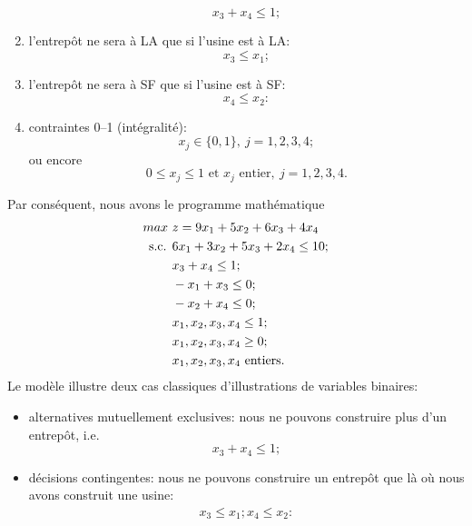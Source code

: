 \begin{example}
\begin{enumerate}
\[
x_3 + x_4 \leq 1;
\]
\item
l'entrepôt ne sera à LA que si l'usine est à LA:
\[
x_3 \leq x_1;
\]
\item
l'entrepôt ne sera à SF que si l'usine est à SF:
\[
x_4 \leq x_2:
\]
\item
contraintes 0--1 (intégralité):
\[
x_j \in \lbrace 0, 1 \rbrace,\ j = 1, 2, 3, 4;
\]
ou encore
\[
0 \leq x_j \leq 1 \mbox{ et } x_j \mbox{ entier},\ j = 1, 2, 3, 4.
\]
\end{enumerate}
Par conséquent, nous avons le programme mathématique
\begin{align*}
max\ & z = 9x_1 + 5x_2 + 6x_3 + 4x_4 \\
\mbox{s.c. } & 6x_1 + 3x_2 + 5x_3 + 2x_4 \leq 10; \\
& x_3 + x_4 \leq 1; \\
& -x_1 + x_3 \leq 0; \\
& -x_2 + x_4 \leq 0; \\
& x_1, x_2, x_3, x_4 \leq 1; \\
& x_1, x_2, x_3, x_4 \geq 0; \\
& x_1, x_2, x_3, x_4 \mbox{ entiers}.
\end{align*}
Le modèle illustre deux cas classiques d'illustrations de variables binaires:
\begin{itemize}
\item
alternatives mutuellement exclusives: nous ne pouvons construire plus d'un entrepôt, i.e.
\[
x_3 + x_4 \leq 1;
\]
\item
décisions contingentes: nous ne pouvons construire un entrepôt que là où nous avons construit une usine:
\begin{align*}
x_3 \leq x_1;
x_4 \leq x_2:
\end{align*}
\end{itemize}
\end{example}

